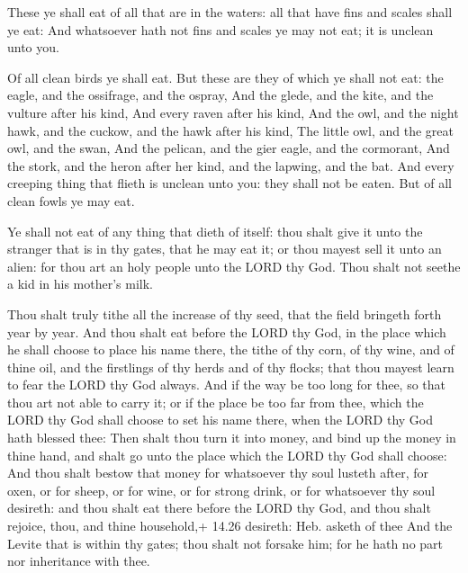  These ye shall eat of all that are in the waters: all
that have fins and scales shall ye eat:  And whatsoever
hath not fins and scales ye may not eat; it is unclean unto you.

 Of all clean birds ye shall eat.  But these
are they of which ye shall not eat: the eagle, and the ossifrage, and
the ospray,  And the glede, and the kite, and the vulture
after his kind,  And every raven after his kind,
 And the owl, and the night hawk, and the cuckow, and the
hawk after his kind,  The little owl, and the great owl,
and the swan,  And the pelican, and the gier eagle, and the
cormorant,  And the stork, and the heron after her kind,
and the lapwing, and the bat.  And every creeping thing
that flieth is unclean unto you: they shall not be eaten. 
But of all clean fowls ye may eat.

 Ye shall not eat of any thing that dieth of itself: thou
shalt give it unto the stranger that is in thy gates, that he may eat
it; or thou mayest sell it unto an alien: for thou art an holy people
unto the LORD thy God. Thou shalt not seethe a kid in his mother's milk.

 Thou shalt truly tithe all the increase of thy seed, that
the field bringeth forth year by year.  And thou shalt eat
before the LORD thy God, in the place which he shall choose to place his
name there, the tithe of thy corn, of thy wine, and of thine oil, and
the firstlings of thy herds and of thy flocks; that thou mayest learn to
fear the LORD thy God always.  And if the way be too long
for thee, so that thou art not able to carry it; or if the place be too
far from thee, which the LORD thy God shall choose to set his name
there, when the LORD thy God hath blessed thee:  Then shalt
thou turn it into money, and bind up the money in thine hand, and shalt
go unto the place which the LORD thy God shall choose:  And
thou shalt bestow that money for whatsoever thy soul lusteth after, for
oxen, or for sheep, or for wine, or for strong drink, or for whatsoever
thy soul desireth: and thou shalt eat there before the LORD thy God, and
thou shalt rejoice, thou, and thine household,+ 14.26 desireth: Heb.
asketh of thee  And the Levite that is within thy gates;
thou shalt not forsake him; for he hath no part nor inheritance with
thee.

